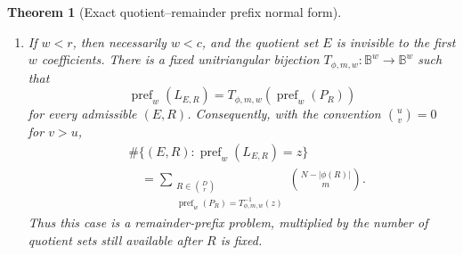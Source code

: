 \documentclass[11pt,a4paper]{amsart}
\numberwithin{equation}{section}
\newtheorem{theorem}{Theorem}[section]
\theoremstyle{remark}
\newcommand{\B}{\mathbb B}
\begin{document}
\begin{theorem}[Exact quotient--remainder prefix normal form]
\begin{enumerate}[label=\textup{(\roman*)},leftmargin=*]
\item If $w<r$, then necessarily $w<c$, and the quotient set $E$ is
      invisible to the first $w$ coefficients.  There is a fixed
      unitriangular bijection $T_{\phi,m,w}:\B^w\to\B^w$ such that
      \[
          \operatorname{pref}_w(L_{E,R})
          =T_{\phi,m,w}(\operatorname{pref}_w(P_R))                 \tag{QR3}
      \]
      for every admissible $(E,R)$.  Consequently, with the convention
      \(\binom uv=0\) for $v>u$,
      \[
      \begin{split}
       &\#\{(E,R):\operatorname{pref}_w(L_{E,R})=z\}\\
       &\quad=
       \sum_{\substack{R\in\binom Dr\\
          \operatorname{pref}_w(P_R)=T_{\phi,m,w}^{-1}(z)}}
          \binom{N-|\phi(R)|}{m}.
      \end{split}                                  \tag{QR4}\label{eq:qr-shallow-remainder}
      \]
      Thus this case is a remainder-prefix problem, multiplied by the
      number of quotient sets still available after $R$ is fixed.
\end{enumerate}
\end{theorem}
\end{document}
